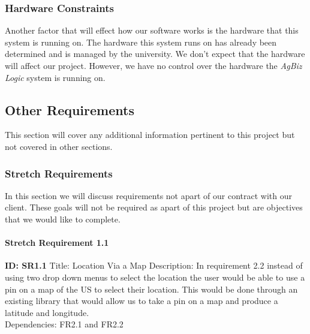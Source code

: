 \documentclass[onecolumn, draftclsnofoot,10pt, compsoc]{article}
\begin{document}
			\subsubsection{Hardware Constraints}
				Another factor that will effect how our software works is the hardware that this system is running on. The hardware this system runs on has already been determined and is managed by the university. We don't expect that the hardware will affect our project. However, we have no control over the hardware the \textit{AgBiz Logic} system is running on.\\

    \subsection{Other Requirements}
				This section will cover any additional information pertinent to this project but not covered in other sections.\\
				\subsubsection{Stretch Requirements}
				In this section we will discuss requirements not apart of our contract with our client. These goals will not be required as apart of this project but are objectives that we would like to complete.\\
					\paragraph{Stretch Requirement 1.1}
						\textbf{ID: SR1.1}\hfill \break
						Title: Location Via a Map \hfill \break
						Description: In requirement 2.2 instead of using two drop down menus to select the location the user would be able to use a pin on a map of the US to select their location. This would be done through an existing library that would allow us to take a pin on a map and produce a latitude and longitude.\\
						Dependencies: FR2.1 and FR2.2\\
						
\end{document}
